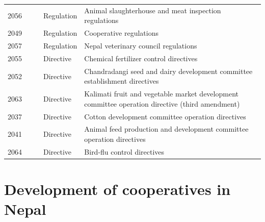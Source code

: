 \documentclass[
  openany]{book}
\begin{document}
\begin{table}[H]
\begin{tabular}[t]{rrrll}
2056 &  &  & Regulation & Animal slaughterhouse and meat inspection regulations\\
\rowcolor{gray!6}  2049 &  &  & Regulation & Cooperative regulations\\
2057 &  &  & Regulation & Nepal veterinary council regulations\\
\rowcolor{gray!6}  2055 &  &  & Directive & Chemical fertilizer control directives\\
2052 &  &  & Directive & Chandradangi seed and dairy development committee establishment directives\\
\addlinespace
\rowcolor{gray!6}  2063 &  &  & Directive & Kalimati fruit and vegetable market development committee operation directive (third amendment)\\
2037 &  &  & Directive & Cotton development committee operation directives\\
\rowcolor{gray!6}  2041 &  &  & Directive & Animal feed production and development committee operation directives\\
2064 &  &  & Directive & Bird-flu control directives\\
\bottomrule
\end{tabular}
\end{table}

\hypertarget{development-of-cooperatives-in-nepal}{%
\section{Development of cooperatives in Nepal}\label{development-of-cooperatives-in-nepal}}
\end{document}
